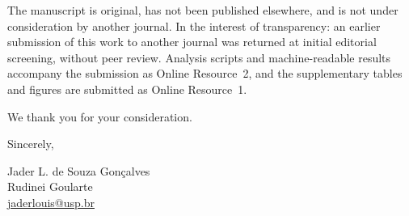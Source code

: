 \documentclass[11pt,a4paper]{article}
\begin{document}
The manuscript is original, has not been published elsewhere, and is not under
consideration by another journal. In the interest of transparency: an earlier
submission of this work to another journal was returned at initial editorial
screening, without peer review. Analysis scripts and machine-readable results
accompany the submission as Online Resource~2, and the supplementary tables and
figures are submitted as Online Resource~1.

We thank you for your consideration.

\bigskip
\noindent Sincerely,

\bigskip
\noindent Jader L. de Souza Gon\c{c}alves\\
Rudinei Goularte\\
\href{mailto:jaderlouis@usp.br}{jaderlouis@usp.br}
\end{document}
